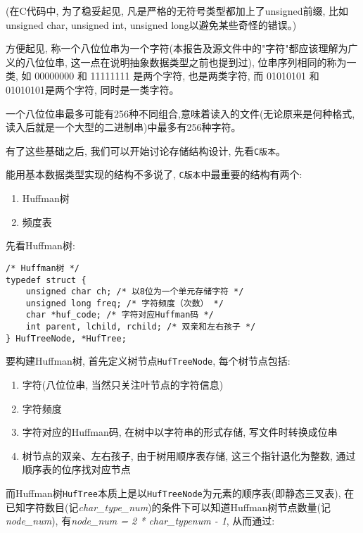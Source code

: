 \documentclass[a4paper]{ctexart}
\begin{document}
(在C代码中, 为了稳妥起见, 凡是严格的无符号类型都加上了unsigned前缀, 比如unsigned char, unsigned int, unsigned long以避免某些奇怪的错误。)

方便起见, 称一个八位位串为一个字符(本报告及源文件中的"字符"都应该理解为广义的八位位串, 这一点在说明抽象数据类型之前也提到过), 位串序列相同的称为一类, 如 00000000 和 11111111 是两个字符, 也是两类字符, 而 01010101 和 01010101是两个字符, 同时是一类字符。

一个八位位串最多可能有256种不同组合,意味着读入的文件(无论原来是何种格式, 读入后就是一个大型的二进制串)中最多有256种字符。

有了这些基础之后, 我们可以开始讨论存储结构设计, 先看\texttt{C版本}。

能用基本数据类型实现的结构不多说了, \texttt{C版本}中最重要的结构有两个:

\begin{enumerate}
\def\labelenumi{\arabic{enumi}.}
\item
  Huffman树
\item
  频度表
\end{enumerate}

先看Huffman树:

{\setmainfont{Courier New Bold}              
\begin{lstlisting}
/* Huffman树 */
typedef struct {
    unsigned char ch; /* 以8位为一个单元存储字符 */
    unsigned long freq; /* 字符频度（次数） */
    char *huf_code; /* 字符对应Huffman码 */
    int parent, lchild, rchild; /* 双亲和左右孩子 */
} HufTreeNode, *HufTree;
\end{lstlisting}}

要构建Huffman树, 首先定义树节点\texttt{HufTreeNode}, 每个树节点包括:

\begin{enumerate}
\def\labelenumi{\arabic{enumi}.}
\item
  字符(八位位串, 当然只关注叶节点的字符信息)
\item
  字符频度
\item
  字符对应的Huffman码, 在树中以字符串的形式存储, 写文件时转换成位串
\item
  树节点的双亲、左右孩子, 由于树用顺序表存储, 这三个指针退化为整数, 通过顺序表的位序找对应节点
\end{enumerate}

而Huffman树\texttt{HufTree}本质上是以\texttt{HufTreeNode}为元素的顺序表(即静态三叉表), 在已知字符数目(记\emph{char\_type\_num})的条件下可以知道Huffman树节点数量(记\emph{node\_num}), 有\emph{node\_num = 2 * char\_typenum - 1}, 从而通过:
\end{document}
